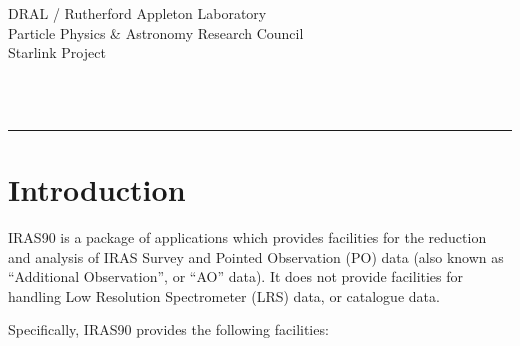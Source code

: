 \thispagestyle{empty}
DRAL / {\sc Rutherford Appleton Laboratory} \hfill {\bf \stardocname}\\
{\large Particle Physics \& Astronomy Research Council}\\
{\large Starlink Project\\}
{\large \stardoccategory\ \stardocnumber}
\begin{flushright}
\stardocauthors\\
\stardocdate
\end{flushright}
\vspace{-4mm}
\rule{\textwidth}{0.5mm}
\vspace{5mm}
\begin{center}
{\Large\bf \stardoctitle}
\end{center}
\vspace{5mm}

\setlength{\parskip}{0mm} \tableofcontents
\setlength{\parskip}{\medskipamount} \markright{\stardocname} \newpage

\section{Introduction}
{\small IRAS90} is a package of applications which provides facilities for the
reduction and analysis of {\small IRAS} Survey and Pointed Observation (PO) data (also
known as ``Additional Observation'', or ``AO'' data). It does not provide
facilities for handling Low Resolution Spectrometer (LRS) data, or catalogue
data.

Specifically, {\small IRAS90} provides the following facilities:

